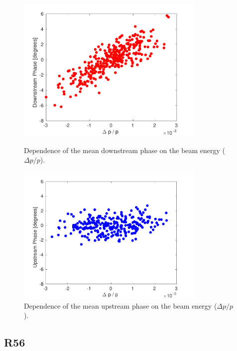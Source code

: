 \begin{figure}
  \centering
    \includegraphics[width=0.8\textwidth]{Figures/propagation/corrDownstreamEn}
  \caption{Dependence of the mean downstream phase on the beam energy (\(\Delta p/p\)).}
  \label{f:corrDownstream_En}
  \includegraphics[width=0.8\textwidth]{Figures/propagation/corrUpstreamEn}
  \caption{Dependence of the mean upstream phase on the beam energy (\(\Delta p/p\)).}
  \label{f:corrUpstream_En}
\end{figure}

\subsection{R56}
\label{ss:r56Equations}

